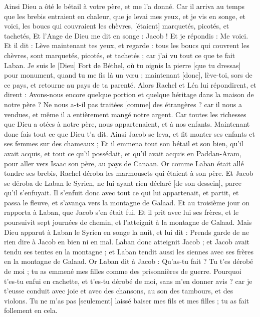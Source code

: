\begin{multicols}{2}
Ainsi Dieu a ôté le bétail à votre père, et me l'a donné.
Car il arriva au temps que les brebis entraient en chaleur, que je levai mes yeux, et je vis en songe, et voici, les boucs qui couvraient les chèvres, [étaient] marquetés, picotés, et tachetés,
Et l'Ange de Dieu me dit en songe : Jacob ! Et je répondis : Me voici.
Et il dit : Lève maintenant tes yeux, et regarde : tous les boucs qui couvrent les chèvres, sont marquetés, picotés, et tachetés ; car j'ai vu tout ce que te fait Laban.
Je suis le [Dieu] Fort de Béthel, où tu oignis la pierre [que tu dressas] pour monument, quand tu me fis là un vœu ; maintenant [donc], lève-toi, sors de ce pays, et retourne au pays de ta parenté.
Alors Rachel et Léa lui répondirent, et dirent : Avons-nous encore quelque portion et quelque héritage dans la maison de notre père ?
Ne nous a-t-il pas traitées [comme] des étrangères ? car il nous a vendues, et même il a entièrement mangé notre argent.
Car toutes les richesses que Dieu a otées à notre père, nous appartenaient, et à nos enfants. Maintenant donc fais tout ce que Dieu t'a dit.
Ainsi Jacob se leva, et fit monter ses enfants et ses femmes sur des chameaux ;
Et il emmena tout son bétail et son bien, qu'il avait acquis, et tout ce qu'il possédait, et qu'il avait acquis en Paddan-Aram, pour aller vers Isaac son père, au pays de Canaan.
Or comme Laban était allé tondre ses brebis, Rachel déroba les marmousets qui étaient à son père.
Et Jacob se déroba de Laban le Syrien, ne lui ayant rien déclaré [de son dessein], parce qu'il s'enfuyait.
Il s'enfuit donc avec tout ce qui lui appartenait, et partit, et passa le fleuve, et s'avança vers la montagne de Galaad.
Et au troisième jour on rapporta à Laban, que Jacob s'en était fui.
Et il prit avec lui ses frères, et le poursuivit sept journées de chemin, et l'atteignit à la montagne de Galaad.
Mais Dieu apparut à Laban le Syrien en songe la nuit, et lui dit : Prends garde de ne rien dire à Jacob en bien ni en mal.
Laban donc atteignit Jacob ; et Jacob avait tendu ses tentes en la montagne ; et Laban tendit aussi les siennes avec ses frères en la montagne de Galaad.
Or Laban dit à Jacob : Qu'as-tu fait ? Tu t'es dérobé de moi ; tu as emmené mes filles comme des prisonnières de guerre.
Pourquoi t'es-tu enfui en cachette, et t'es-tu dérobé de moi, sans m'en donner avis ? car je t'eusse conduit avec joie et avec des chansons, au son des tambours, et des violons.
Tu ne m'as pas [seulement] laissé baiser mes fils et mes filles ; tu as fait follement en cela.

\end{multicols}

